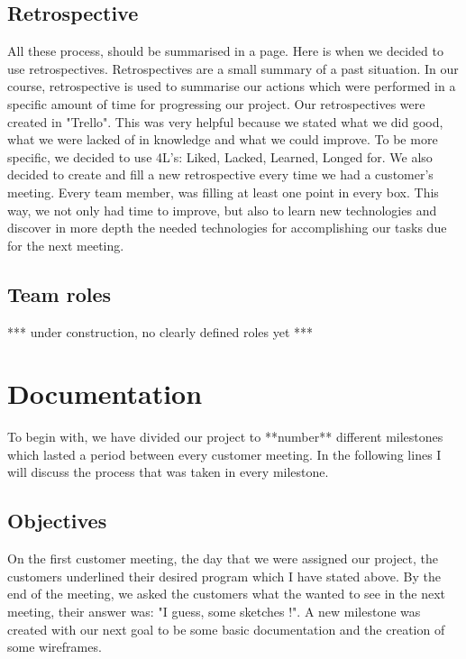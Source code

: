 \documentclass{l3proj}
\begin{document}
 \subsection{Retrospective}
\label{retrospective}
 
 All these process, should be summarised in a page. Here is when we decided to use retrospectives. Retrospectives are a small summary of a past situation. In our course, retrospective is used to summarise our actions which were performed in a specific amount of time for progressing our project. Our retrospectives were created in "Trello". This was very helpful because we stated what we did good, what we were lacked of in knowledge and what we could improve. To be more specific, we decided to use 4L's: Liked, Lacked, Learned, Longed for. We also decided to create and fill a new retrospective every time we had a customer's meeting. Every team member, was filling at least one point in every box. This way, we not only had time to improve, but also to learn new technologies and discover in more depth the needed technologies for accomplishing our tasks due for the next meeting.

\subsection{Team roles}
\label{roles}
*** under construction, no clearly defined roles yet ***
 






\section{Documentation}
\label{documentation}

To begin with, we have divided our project to **number** different milestones which lasted a period between every customer meeting. In the following lines I will discuss the process that was taken in every milestone.

\subsection{Objectives}
\label{objectives} 

On the first customer meeting, the day that we were assigned our project, the customers underlined their desired program which I have stated above. By the end of the meeting, we asked the customers what the wanted to see in the next meeting, their answer was: "I guess, some sketches !". A new milestone was created with our next goal to be some basic documentation and the creation of some wireframes.
\end{document}
